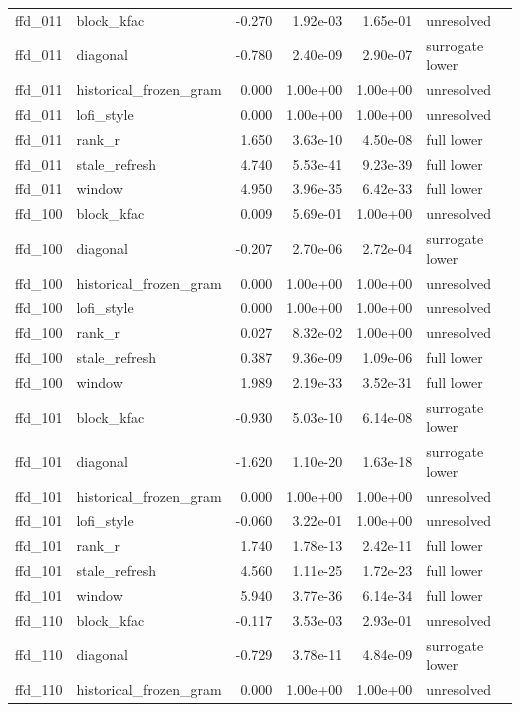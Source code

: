 \begin{table}[p]
\begin{tabular}{llrrrl}
ffd\_011 & block\_kfac & -0.270 & 1.92e-03 & 1.65e-01 & unresolved \\
ffd\_011 & diagonal & -0.780 & 2.40e-09 & 2.90e-07 & surrogate lower \\
ffd\_011 & historical\_frozen\_gram & 0.000 & 1.00e+00 & 1.00e+00 & unresolved \\
ffd\_011 & lofi\_style & 0.000 & 1.00e+00 & 1.00e+00 & unresolved \\
ffd\_011 & rank\_r & 1.650 & 3.63e-10 & 4.50e-08 & full lower \\
ffd\_011 & stale\_refresh & 4.740 & 5.53e-41 & 9.23e-39 & full lower \\
ffd\_011 & window & 4.950 & 3.96e-35 & 6.42e-33 & full lower \\
ffd\_100 & block\_kfac & 0.009 & 5.69e-01 & 1.00e+00 & unresolved \\
ffd\_100 & diagonal & -0.207 & 2.70e-06 & 2.72e-04 & surrogate lower \\
ffd\_100 & historical\_frozen\_gram & 0.000 & 1.00e+00 & 1.00e+00 & unresolved \\
ffd\_100 & lofi\_style & 0.000 & 1.00e+00 & 1.00e+00 & unresolved \\
ffd\_100 & rank\_r & 0.027 & 8.32e-02 & 1.00e+00 & unresolved \\
ffd\_100 & stale\_refresh & 0.387 & 9.36e-09 & 1.09e-06 & full lower \\
ffd\_100 & window & 1.989 & 2.19e-33 & 3.52e-31 & full lower \\
ffd\_101 & block\_kfac & -0.930 & 5.03e-10 & 6.14e-08 & surrogate lower \\
ffd\_101 & diagonal & -1.620 & 1.10e-20 & 1.63e-18 & surrogate lower \\
ffd\_101 & historical\_frozen\_gram & 0.000 & 1.00e+00 & 1.00e+00 & unresolved \\
ffd\_101 & lofi\_style & -0.060 & 3.22e-01 & 1.00e+00 & unresolved \\
ffd\_101 & rank\_r & 1.740 & 1.78e-13 & 2.42e-11 & full lower \\
ffd\_101 & stale\_refresh & 4.560 & 1.11e-25 & 1.72e-23 & full lower \\
ffd\_101 & window & 5.940 & 3.77e-36 & 6.14e-34 & full lower \\
ffd\_110 & block\_kfac & -0.117 & 3.53e-03 & 2.93e-01 & unresolved \\
ffd\_110 & diagonal & -0.729 & 3.78e-11 & 4.84e-09 & surrogate lower \\
ffd\_110 & historical\_frozen\_gram & 0.000 & 1.00e+00 & 1.00e+00 & unresolved \\

\end{tabular}
\end{table}
